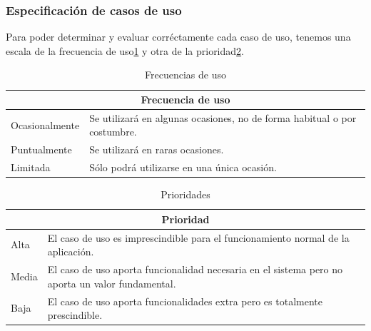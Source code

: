\subsubsection{Especificación de casos de uso}
Para poder determinar y evaluar corréctamente cada caso de uso, tenemos una escala de la frecuencia de uso\ref{tab_frec_uso} y otra de la prioridad\ref{tab_prior}.

\begin{table}[htpb]
\centering
\begin{tabularx}{\textwidth}{|l|X|}
\hline
\multicolumn{2}{|c|}{Frecuencia de uso}                                                   \\ \hline
Ocasionalmente & Se utilizará en algunas ocasiones, no de forma habitual o por costumbre. \\ \hline
Puntualmente   & Se utilizará en raras ocasiones.                                         \\ \hline
Limitada       & Sólo podrá utilizarse en una única ocasión.                              \\ \hline
\end{tabularx}
\caption{Frecuencias de uso}
\label{tab_frec_uso}
\end{table}

\begin{table}[htpb]
\centering
\begin{tabularx}{\textwidth}{|l|X|}
\hline
\multicolumn{2}{|c|}{Prioridad}                                                                          \\ \hline
Alta  & El caso de uso es imprescindible para el funcionamiento normal de la aplicación.                 \\ \hline
Media & El caso de uso aporta funcionalidad necesaria en el sistema pero no aporta un valor fundamental. \\ \hline
Baja  & El caso de uso aporta funcionalidades extra pero es totalmente prescindible.                     \\ \hline
\end{tabularx}
\caption{Prioridades}
\label{tab_prior}
\end{table}

